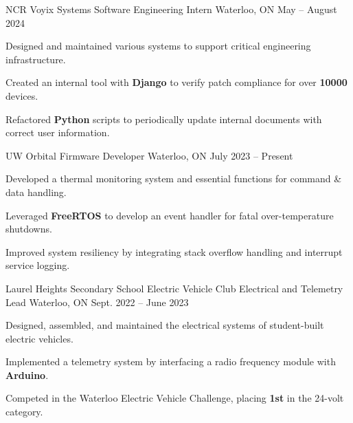 
\begin{cventries}

        
 \cventry
    {NCR Voyix} %
    {Systems Software Engineering Intern} %
    {Waterloo, ON} %
    {May -- August 2024} %
    {
        \begin{cvitems}
            \item {Designed and maintained various systems to support critical engineering infrastructure.}
            \item {Created an internal tool with \textbf{Django} to verify patch compliance for over \textbf{10000} devices.}
            \item {Refactored \textbf{Python} scripts to periodically update internal documents with correct user information.}
        \end{cvitems}
    }
    
 \cventry
    {UW Orbital} %
    {Firmware Developer} %
    {Waterloo, ON} %
    {July 2023 -- Present} %
    {
      \begin{cvitems} %
        \item {Developed a thermal monitoring system and essential functions for command \& data handling.}
	    \item {Leveraged \textbf{FreeRTOS} to develop an event handler for fatal over-temperature shutdowns.}
        \item {Improved system resiliency by integrating stack overflow handling and interrupt service logging.}
      \end{cvitems}
    }

 \cventry
    {Laurel Heights Secondary School Electric Vehicle Club} %
    {Electrical and Telemetry Lead} %
    {Waterloo, ON} %
    {Sept. 2022 -- June 2023} %
    {
      \begin{cvitems} %
        \item {Designed, assembled, and maintained the electrical systems of student-built electric vehicles.}
	    \item {Implemented a telemetry system by interfacing a radio frequency module with \textbf{Arduino}.}
        \item {Competed in the Waterloo Electric Vehicle Challenge, placing \textbf{1st} in the 24-volt category.}
      \end{cvitems}
    }
    
\end{cventries}
